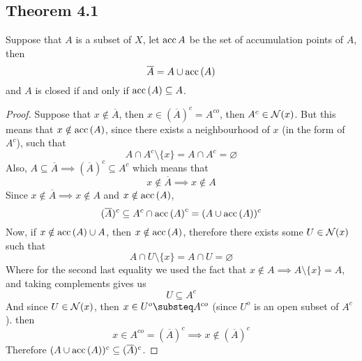 \documentclass[../../main.tex]{subfiles}
\begin{document}
\subsection{Theorem 4.1}
\begin{wts}
Suppose that $A$ is a subset of $X$, let $\operatorname{acc}{A}$ be the set of accumulation points of $A$, then
\begin{equation}
    \overline{A}=A\cup\operatorname{acc}{(A)}
\end{equation}
and $A$ is closed if and only if $\operatorname{acc}{(A)}\subseteq A$.
\end{wts}
\begin{proof}
Suppose that $x\notin \overline{A}$, then $x\in (\overline{A})^c=A^{co}$, then $A^c\in\mathcal{N}({x})$. But this means that $x\notin\operatorname{acc}{(A)}$, since there exists a neighbourhood of $x$ (in the form of $A^c$), such that 
\[
A\cap A^c\setminus\{x\}=A\cap A^c=\varnothing
\]
Also, $A\subseteq \overline{A}\implies (\overline{A})^c\subseteq A^c$ which means that
\[
x\notin \overline{A}\implies x\notin A
\]
Since $x\notin \overline{A}\implies x\notin A$ and $x\notin \operatorname{acc}{(A)}$,
\[
(\overline{A})^c\subseteq A^c\cap \operatorname{acc}{(A)}^c = (A\cup \operatorname{acc}{(A)})^c
\]
Now, if $x\notin \operatorname{acc}{(A)}\cup A$, then $x\notin\operatorname{acc}{(A)}$, therefore there exists some $U\in\mathcal{N}({x})$ such that 
\[
A\cap U\setminus\{x\} = A\cap U=\varnothing
\]
Where for the second last equality we used the fact that $x\notin A\implies A\setminus\{x\}=A$, and taking complements gives us
\[
U\subseteq A^c
\]
And since $U\in\mathcal{N}({x})$, then $x\in U^o\substeq A^{co}$ (since $U^o$ is an open subset of $A^c$). then
\[
x\in A^{co} = (\overline{A})^c\implies x\notin (\overline{A})^c
\]
Therefore $(A\cup\operatorname{acc}{(A)})^c\subseteq (\overline{A})^c$.
\end{proof}
\end{document}
